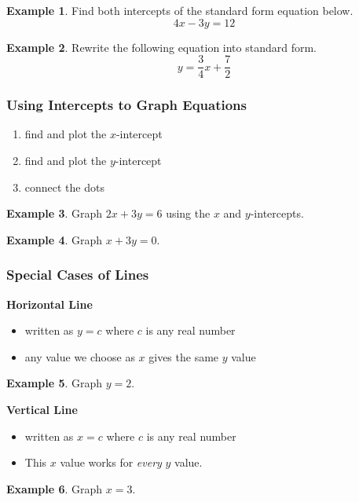 \documentclass[addpoints,12pt]{exam}
\theoremstyle{definition}
\theoremstyle{break}
\theoremstyle{break}
\newtheorem{example}{Example}[subsection]
\begin{document}
\begin{example}
Find both intercepts of the standard form equation below.
\[4x - 3y = 12\]
\vspace{2.5in}
\end{example}

\begin{example}
Rewrite the following equation into standard form.
\[y = \dfrac{3}{4}x + \dfrac{7}{2}\]
\end{example}
\newpage

\subsubsection*{Using Intercepts to Graph Equations}
\begin{enumerate}
\item find and plot the $x$-intercept
\item find and plot the $y$-intercept
\item connect the dots
\end{enumerate}

\vspace{.15in}

\begin{example}
Graph $2x+3y=6$ using the $x$ and $y$-intercepts.
\vspace{2.75in}
\end{example}

\begin{example}
Graph $x+3y=0$.
\end{example}

\newpage

\subsubsection*{Special Cases of Lines}

\textbf{Horizontal Line}
\begin{itemize}
\item written as $y=c$ where $c$ is any real number
\item any value we choose as $x$ gives the same $y$ value
\end{itemize}
\vspace{.15in}
\begin{example}
Graph $y=2$.
\vspace{2in}
\end{example}

\textbf{Vertical Line}
\begin{itemize}
\item written as $x=c$ where $c$ is any real number
\item This $x$ value works for \emph{every} $y$ value.
\end{itemize}
\vspace{.15in}

\begin{example}
Graph $x=3$.
\end{example}
\end{document}
